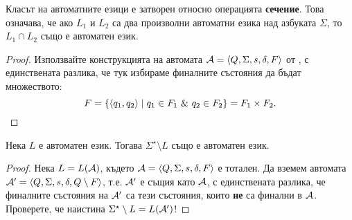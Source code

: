 \begin{cor}
  Класът на автоматните езици е затворен относно операцията {\bf сечение}.
  Това означава, че ако $L_1$ и $L_2$ са два произволни автоматни езика над азбуката $\Sigma$, то $L_1\cap L_2$
  също е автоматен език.
\end{cor}
\begin{proof}
  Използвайте конструкцията на автомата $\mathcal{A} = \langle{Q,\Sigma,s,\delta,F}\rangle$ от ,
  с единствената разлика, че тук избираме финалните състояния да бъдат множеството:
  \[F = \{\pair{q_1,q_2} \mid q_1 \in F_1\ \&\ q_2 \in F_2\} = F_1\times F_2.\]
\end{proof}

\begin{prop}
  Нека $L$ е автоматен език.
  Тогава $\Sigma^\star\setminus L$ също е автоматен език.
\end{prop}
\begin{proof}
  Нека $L = L(\mathcal{A})$, където $\mathcal{A} = \langle{Q,\Sigma,s,\delta,F}\rangle$ е тотален.
  Да вземем автомата $\mathcal{A}' = \langle{Q,\Sigma,s,\delta,Q\setminus F}\rangle$,
  т.е. $\mathcal{A}'$ е същия като $\mathcal{A}$, с единствената разлика, че финалните състояния на $\mathcal{A}'$
  са тези състояния, които {\bf не} са финални в $\mathcal{A}$.
  Проверете, че наистина $\Sigma^\star\setminus L = L(\mathcal{A}^\prime)$!
\end{proof}


